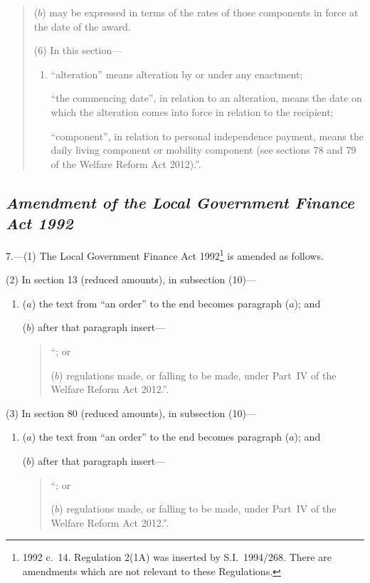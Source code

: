 \documentclass[12pt,a4paper]{article}
\begin{document}
\begin{quotation}
\begin{enumerate}
($b$) may be expressed in terms of the rates of those components in force at the date of the award.
\end{enumerate}

(6) In this section—
\begin{enumerate}\item[]
    “alteration” means alteration by or under any enactment;

    “the commencing date”, in relation to an alteration, means the date on which the alteration comes into force in relation to the recipient;

    “component”, in relation to personal independence payment, means the daily living component or mobility component (see sections 78 and 79 of the Welfare Reform Act 2012).”. 
\end{enumerate}
\end{quotation}

\subsection*{\itshape\sloppy Amendment of the Local Government Finance Act 1992}

7.—(1) The Local Government Finance Act 1992\footnote{1992 c.~14. Regulation 2(1A) was inserted by S.I.~1994/268. There are amendments which are not relevant to these Regulations.} is amended as follows.

(2) In section 13 (reduced amounts), in subsection (10)—
\begin{enumerate}\item[]
($a$) the text from “an order” to the end becomes paragraph ($a$); and

($b$) after that paragraph insert—
\begin{quotation}
“; or

($b$) regulations made, or falling to be made, under Part~IV of the Welfare Reform Act 2012.”.
\end{quotation}
\end{enumerate}

(3) In section 80 (reduced amounts), in subsection (10)—
\begin{enumerate}\item[]
($a$) the text from “an order” to the end becomes paragraph ($a$); and

($b$) after that paragraph insert—
\begin{quotation}
“; or

($b$) regulations made, or falling to be made, under Part~IV of the Welfare Reform Act 2012.”.
\end{quotation}
\end{enumerate}
\end{document}
